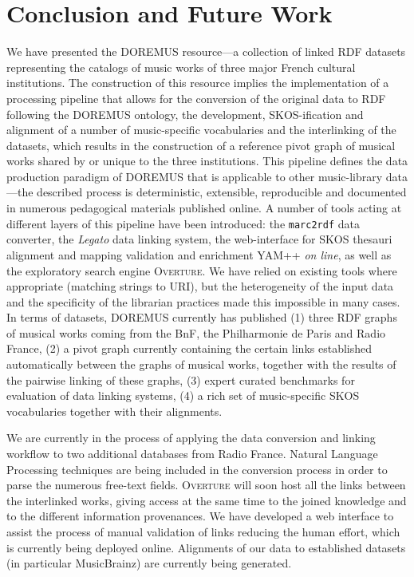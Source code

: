 \section{Conclusion and Future Work} \label{sec:conclusion}
We have presented the DOREMUS resource---a collection of linked RDF datasets representing the catalogs of music works of three major French cultural institutions. The construction of this resource implies the implementation of a processing pipeline that allows for the conversion of the original data to RDF following the DOREMUS ontology, the development, SKOS-ification and alignment of a number of music-specific vocabularies and the interlinking of the datasets, which results in the construction of a reference pivot graph of musical works shared by or unique to the three  institutions. This pipeline defines the data production paradigm of DOREMUS that is applicable to other music-library data---the described process is deterministic, extensible, reproducible and documented in numerous pedagogical materials published online. A number of tools acting at different layers of this pipeline have been introduced: the {\tt marc2rdf} data converter, the {\it Legato} data linking system, the web-interface for SKOS thesauri alignment and mapping validation and enrichment YAM++ {\it on line},  as well as the exploratory search engine \textsc{Overture}. We have relied on existing tools where appropriate (matching strings to URI), but the heterogeneity of the input data and the specificity of the librarian practices made this impossible in many cases. In terms of datasets, DOREMUS currently has published (1) three RDF graphs of musical works coming from the BnF, the Philharmonie de Paris and Radio France, (2) a pivot graph currently containing the certain links established automatically between the graphs of musical works, together with the results of the pairwise linking of these graphs, (3) expert curated benchmarks for evaluation of data linking systems, (4) a rich set of music-specific SKOS vocabularies together with their alignments.

We are currently in the process of applying the data conversion and linking workflow to two additional databases from Radio France. Natural Language Processing techniques are being included in the conversion process in order to parse the numerous free-text fields. \textsc{Overture} will soon host all the links between the interlinked works, giving access at the same time to the joined knowledge and to the different information provenances. We have developed a web interface to assist the process of manual validation of links reducing the human effort, which is currently being deployed online.  Alignments of our data to established datasets (in particular MusicBrainz) are currently being generated.